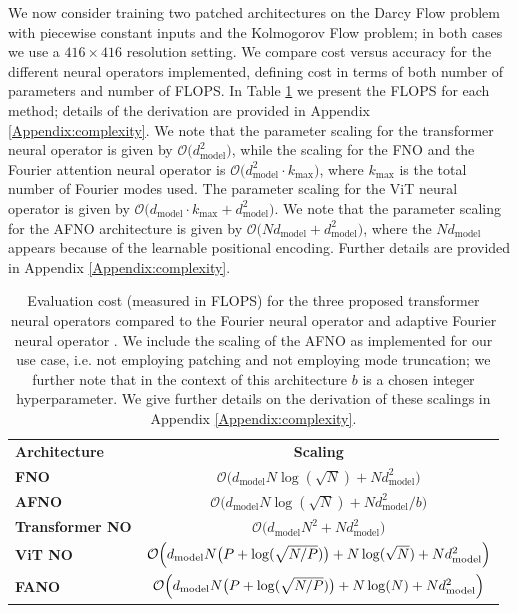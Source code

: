 \documentclass[twoside]{article}
\newcommand{\1}{\mathbbm{1}}
\newcommand{\cO}{\mathcal{O}}
\begin{document}
We now consider training two patched architectures on the Darcy Flow problem with piecewise
constant inputs and the Kolmogorov Flow problem; in both cases 
we use a $416\times 416$ resolution setting.  We compare cost versus accuracy for the different neural operators implemented, defining cost in terms of both number of parameters and number of FLOPS. In Table \ref{tab:evaluation_cost} we present the FLOPS for each method; details of the derivation are provided in Appendix \ref{Appendix:complexity}. We note that the parameter scaling for the transformer neural operator is given by $\cO\bigl(d_{\textrm{model}}^2 \bigr)$, while the scaling for the FNO and the Fourier attention neural operator is $\cO\bigl(d_{\textrm{model}}^2 \cdot k_{\textrm{max}}\bigr)$, where $k_{\textrm{max}}$ is the total number of Fourier modes used. The parameter scaling for the ViT neural operator is given by $\cO\bigl(d_{\textrm{model}} \cdot k_{\textrm{max}}+d_{\textrm{model}}^2\bigr)$. We note that the parameter scaling for the AFNO architecture is given by $\cO\bigl(Nd_{\textrm{model}}+d_{\textrm{model}}^2 \bigr)$, where the $Nd_{\textrm{model}}$ appears because of the learnable positional encoding. Further details are provided in Appendix \ref{Appendix:complexity}.


\begin{table}[htbp]
    \centering
    \begin{tabular}{|l|c|}
        \hline
        \cellcolor{gray!30}\textbf{Architecture} & \cellcolor{gray!30}\textbf{Scaling} \\
        \hhline{|==|}
        \textbf{FNO} &  $\cO\bigl(d_{\textrm{model}}N\log(\sqrt{N})+Nd^2_{\textrm{model}} \bigr)$\\
        \hline
        \textbf{AFNO} &  $\cO\bigl(d_{\textrm{model}}N\log(\sqrt{N})+Nd^2_{\textrm{model}}/b \bigr)$\\
        \hline
        \textbf{Transformer NO}& $\cO\bigl(d_{\textrm{model}}N^2+Nd^2_{\textrm{model}}\bigr)$\\
        \hline
        \textbf{ViT NO}&
        $
    \cO\Bigl(d_{\textrm{model}}N\bigl(P+\log(\sqrt{N/P})\bigr)+N\log(\sqrt{N}) +Nd^2_{\textrm{model}}\Bigr)
        $\\
        \hline
        \textbf{FANO}& $
        
        \cO\Bigl(d_{\textrm{model}}N\bigl(P+\log(\sqrt{N/P})\bigr)
        +N\log(N) +Nd^2_{\textrm{model}}\Bigr)
        $\\
        \hline
    \end{tabular}
    \caption{Evaluation cost (measured in FLOPS) for the three proposed transformer neural operators compared to the Fourier neural operator \citep{li2021fourier} and adaptive Fourier neural operator \citep{guibas2022efficient}. We include the scaling of the AFNO as implemented for our use case, i.e. not employing patching and not employing mode truncation; we further note that in the context of this architecture $b$ is a chosen integer hyperparameter. We give further details on the derivation of these scalings in Appendix \ref{Appendix:complexity}.}
    \label{tab:evaluation_cost}
\end{table}
\end{document}
